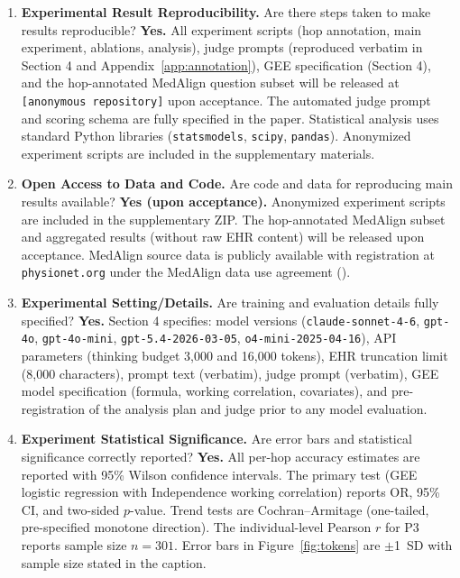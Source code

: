 \documentclass{article}
\begin{document}
\begin{enumerate}
\item \textbf{Experimental Result Reproducibility.}
Are there steps taken to make results reproducible?
\textbf{Yes.} All experiment scripts (hop annotation, main experiment,
ablations, analysis), judge prompts (reproduced verbatim in Section 4 and
Appendix~\ref{app:annotation}), GEE specification (Section 4), and the
hop-annotated MedAlign question subset will be released at
\texttt{[anonymous repository]} upon acceptance. The automated judge prompt
and scoring schema are fully specified in the paper. Statistical analysis
uses standard Python libraries (\texttt{statsmodels}, \texttt{scipy},
\texttt{pandas}). Anonymized experiment scripts are included in the
supplementary materials.

\item \textbf{Open Access to Data and Code.}
Are code and data for reproducing main results available?
\textbf{Yes (upon acceptance).} Anonymized experiment scripts are included
in the supplementary ZIP. The hop-annotated MedAlign subset and aggregated
results (without raw EHR content) will be released upon acceptance.
MedAlign source data is publicly available with registration at
\texttt{physionet.org} under the MedAlign data use agreement
(\citep{wornow2024medalign}).

\item \textbf{Experimental Setting/Details.}
Are training and evaluation details fully specified?
\textbf{Yes.} Section 4 specifies: model versions (\texttt{claude-sonnet-4-6},
\texttt{gpt-4o}, \texttt{gpt-4o-mini}, \texttt{gpt-5.4-2026-03-05},
\texttt{o4-mini-2025-04-16}), API parameters (thinking budget
3{,}000 and 16{,}000 tokens), EHR truncation limit (8{,}000 characters),
prompt text (verbatim), judge prompt (verbatim), GEE model specification
(formula, working correlation, covariates), and pre-registration of the
analysis plan and judge prior to any model evaluation.

\item \textbf{Experiment Statistical Significance.}
Are error bars and statistical significance correctly reported?
\textbf{Yes.} All per-hop accuracy estimates are reported with 95\% Wilson
confidence intervals. The primary test (GEE logistic regression with
Independence working correlation) reports OR, 95\% CI, and two-sided
$p$-value. Trend tests are Cochran--Armitage (one-tailed, pre-specified
monotone direction). The individual-level Pearson $r$ for P3 reports sample
size $n = 301$. Error bars in Figure~\ref{fig:tokens} are $\pm$1~SD with
sample size stated in the caption.


\end{enumerate}
\end{document}
